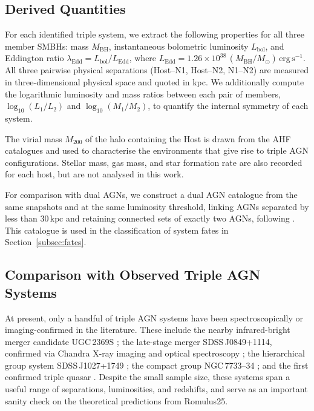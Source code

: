 \documentclass[twocolumn, 10pt]{article}
\begin{document}
\subsection{Derived Quantities}
\label{subsec:derived}

For each identified triple system, we extract the following properties for all three member SMBHs: mass $M_\mathrm{BH}$, instantaneous bolometric luminosity $L_\mathrm{bol}$, and Eddington ratio $\lambda_\mathrm{Edd} = L_\mathrm{bol} / L_\mathrm{Edd}$, where $L_\mathrm{Edd} = 1.26 \times 10^{38}\,(M_\mathrm{BH}/M_\odot)\,\mathrm{erg\,s^{-1}}$. All three pairwise physical separations (Host--N1, Host--N2, N1--N2) are measured in three-dimensional physical space and quoted in kpc. We additionally compute the logarithmic luminosity and mass ratios between each pair of members, $\log_{10}(L_1/L_2)$ and $\log_{10}(M_1/M_2)$, to quantify the internal symmetry of each system.

The virial mass $M_{200}$ of the halo containing the Host is drawn from the AHF catalogues and used to characterise the environments that give rise to triple AGN configurations. Stellar mass, gas mass, and star formation rate are also recorded for each host, but are not analysed in this work.

For comparison with dual AGNs, we construct a dual AGN catalogue from the same snapshots and at the same luminosity threshold, linking AGNs separated by less than $30\,\mathrm{kpc}$ and retaining connected sets of exactly two AGNs, following \citet{Saeedzadeh2024}. This catalogue is used in the classification of system fates in Section~\ref{subsec:fates}.

\subsection{Comparison with Observed Triple AGN Systems}
\label{subsec:obs_comparison}

At present, only a handful of triple AGN systems have been spectroscopically or imaging-confirmed in the literature. These include the nearby infrared-bright merger candidate UGC\,2369S \citep{Ding2025}; the late-stage merger SDSS\,J0849+1114, confirmed via Chandra X-ray imaging and optical spectroscopy \citep{Pfeifle2019}; the hierarchical group system SDSS\,J1027+1749 \citep{Liu2011}; the compact group NGC\,7733--34 \citep{Keshri2025}; and the first confirmed triple quasar \citep{Djorgovski2007}. Despite the small sample size, these systems span a useful range of separations, luminosities, and redshifts, and serve as an important sanity check on the theoretical predictions from Romulus25.
\end{document}
